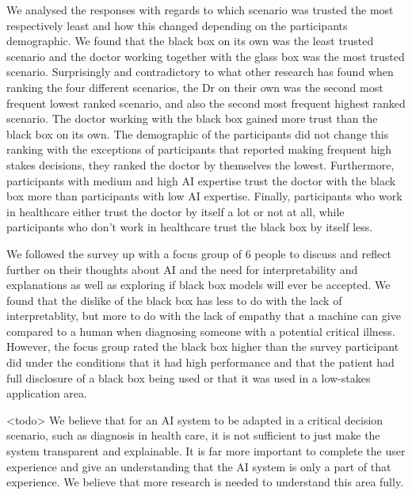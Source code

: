 \documentclass[manuscript,screen,review]{acmart}
\begin{document}
We analysed the responses with regards to which scenario was trusted the most respectively least and how this changed depending on the participants demographic. We found that the black box on its own was the least trusted scenario and the doctor working together with the glass box was the most trusted scenario. Surprisingly and contradictory to what other research has found when ranking the four different scenarios, the Dr on their own was the second most frequent lowest ranked scenario, and also the second most frequent highest ranked scenario. The doctor working with the black box gained  more trust than the black box on its own. The demographic of the participants did not change this ranking with the exceptions of participants that reported making frequent high stakes decisions, they ranked the doctor by themselves the lowest. Furthermore, participants with medium and high AI expertise trust the doctor with the black box more than participants with low AI expertise. Finally, participants who work in healthcare either trust the doctor by itself a lot or not at all, while participants who don’t work in healthcare trust the black box by itself less.

We followed the survey up with a focus group of 6 people to discuss and reflect further on their thoughts about AI and the need for interpretability and explanations as well as exploring if black box models will ever be accepted. We found that the dislike of the black box has less to do with the lack of interpretablity, but more to do with the lack of empathy that a machine can give compared to a human when diagnosing someone with a potential critical illness. However, the focus group rated the black box higher than the survey participant did under the conditions that it had high performance and that the patient had full disclosure of a black box being used or that it was used in a low-stakes application area.


<todo> We believe that for an AI system to be adapted in a critical decision scenario, such as diagnosis in health care, it is not sufficient to just make the system transparent and explainable. It is far more important to complete the user experience and give an understanding that the AI system is only a part of that experience. We believe that more research is needed to understand this area fully.\\
\end{document}
